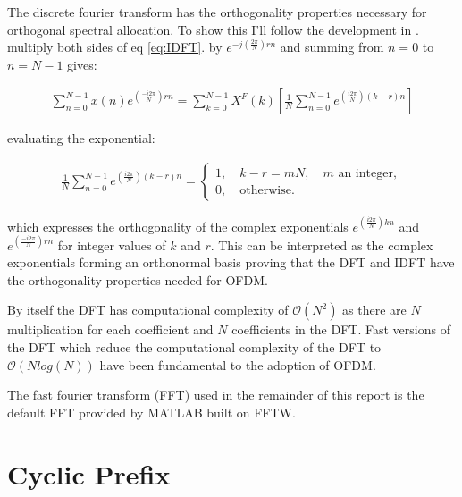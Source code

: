 The discrete fourier transform has the orthogonality %
properties necessary for orthogonal spectral allocation. %
To show this I'll follow the development in \cite{Opp99}. %
multiply both sides of eq \ref{eq:IDFT}. by %
$e^{-j(\frac{2\pi}{N})rn}$ and summing from $n=0$ %
to $n=N-1$ gives:

\begin{align}
	\sum_{n=0}^{N-1}x(n)e^{(\frac{-i 2\pi}{N})rn} = %
	\sum_{k=0}^{N-1}X^{F}(k)\left[\frac{1}{N} \sum_{n=0}^{N-1} %
	e^{(\frac{i 2\pi}{N})(k-r)n}\right]
\end{align}

evaluating the exponential:

\begin{align}
	\frac{1}{N}\sum_{n=0}^{N-1}e^{(\frac{i 2\pi}{N})(k-r)n}%
	= \begin{cases}
		1,\quad k-r = mN, \quad m\text{ an integer},\\
		0,\quad \text{otherwise.}
	\end{cases}
\end{align}

which expresses the orthogonality of the complex exponentials %
$e^{(\frac{i 2\pi}{N})kn}$ and $e^{(\frac{-i 2\pi}{N})rn}$ for %
integer values of $k$ and $r$. This can be interpreted as the %
complex exponentials forming an orthonormal basis proving that %
the DFT and IDFT have the orthogonality properties needed for %
OFDM.

By itself the DFT has computational complexity of $\mathcal{O}(%
N^2)$ as there are $N$ multiplication for each coefficient and %
$N$ coefficients in the DFT. Fast versions of the DFT which %
reduce the computational complexity of the DFT to $\mathcal{O}(%
Nlog(N))$ have been fundamental to the adoption of OFDM.%

The fast fourier transform (FFT) used in the remainder of %
this report %
is the default FFT provided by MATLAB built on FFTW\cite{FFTW}. %
\section{Cyclic Prefix}

